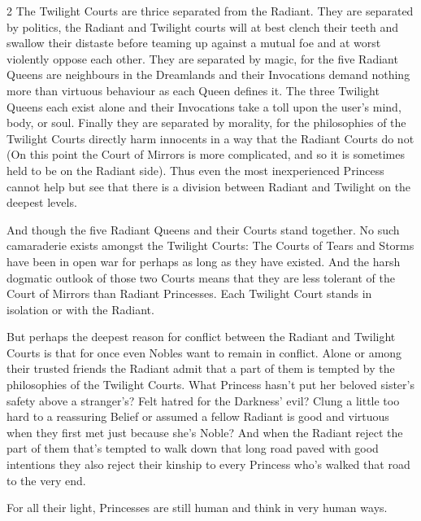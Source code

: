 \begin{multicols}{2}
The Twilight Courts are thrice separated from the Radiant. They are separated by politics, the Radiant and Twilight courts will at best clench their teeth and swallow their distaste before teaming up against a mutual foe and at worst violently oppose each other. They are separated by magic, for the five Radiant Queens are neighbours in the Dreamlands and their Invocations demand nothing more than virtuous behaviour as each Queen defines it. The three Twilight Queens each exist alone and their Invocations take a toll upon the user's mind, body, or soul. Finally they are separated by morality, for the philosophies of the Twilight Courts directly harm innocents in a way that the Radiant Courts do not (On this point the Court of Mirrors is more complicated, and so it is sometimes held to be on the Radiant side). Thus even the most inexperienced Princess cannot help but see that there is a division between Radiant and Twilight on the deepest levels.

And though the five Radiant Queens and their Courts stand together. No such camaraderie exists amongst the Twilight Courts: The Courts of Tears and Storms have been in open war for perhaps as long as they have existed. And the harsh dogmatic outlook of those two Courts means that they are less tolerant of the Court of Mirrors than Radiant Princesses. Each Twilight Court stands in isolation or with the Radiant. 

But perhaps the deepest reason for conflict between the Radiant and Twilight Courts is that for once even Nobles want to remain in conflict. Alone or among their trusted friends the Radiant admit that a part of them is tempted by the philosophies of the Twilight Courts. What Princess hasn't put her beloved sister's safety above a stranger's? Felt hatred for the Darkness' evil? Clung a little too hard to a reassuring Belief or assumed a fellow Radiant is good and virtuous when they first met just because she's Noble? And when the Radiant reject the part of them that's tempted to walk down that long road paved with good intentions they also reject their kinship to every Princess who's walked that road to the very end. 

For all their light, Princesses are still human and think in very human ways. 

\end{multicols}
